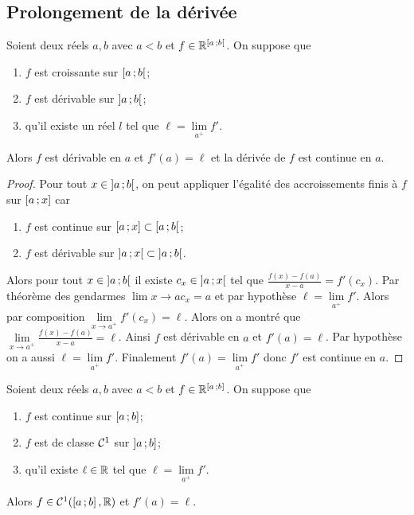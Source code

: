 \subsection{Prolongement de la dérivée}

\begin{theo}
  Soient deux réels \(a,b\) avec \(a <b\) et \(f \in \mathbb{R}^{\left[ a \, ; {} b \right[}\).
  On suppose que
  \begin{enumerate}
    \item \(f\) est croissante sur \(\left[ a \, ; {} b \right[\);
    \item \(f\) est dérivable sur \(\left] a \, ; {} b \right[\);
    \item qu'il existe un réel \(l\) tel que \(\ell = \lim\limits_{a^+}f'\).
  \end{enumerate}
  Alors \(f\) est dérivable en \(a\) et \(f'(a)=\ell\) et la dérivée de \(f\)
  est continue en \(a\).
\end{theo}
\begin{proof}
  Pour tout \(x \in \left] a \, ; {} b \right[\), on peut appliquer l'égalité des
  accroissements finis à \(f\) sur \(\left[ a \, ; {} x \right]\) car
  \begin{enumerate}
    \item \(f\) est continue sur \(\left[ a \, ; {} x \right] \subset
      \left[ a \, ; {} b \right[\);
    \item \(f\) est dérivable sur \(\left] a \, ; {} x \right[ \subset
      \left] a \, ; {} b \right[\).
  \end{enumerate}
  Alors pour tout \(x \in  \left] a \, ; {} b \right[\) il existe \(c_x \in 
  \left] a \, ; {} x \right[\) tel
  que \(\frac{f(x)-f(a)}{x-a}=f'(c_x)\). Par théorème des gendarmes
  \(\lim\limits{x \to a} c_x=a\) et par hypothèse \(\ell =
  \lim\limits_{a^+}f'\). Alors par composition \(\lim\limits_{x \to a^+}
  f'(c_x)=\ell\). Alors on a montré que \(\lim\limits_{x \to a^+}
  \frac{f(x)-f(a)}{x-a} = \ell\). Ainsi \(f\) est dérivable en \(a\) et
  \(f'(a)=\ell\). Par hypothèse on a aussi \(\ell = \lim\limits_{a^+}f'\).
  Finalement \(f'(a)=\lim\limits_{a^+}f'\) donc \(f'\) est continue en \(a\).
\end{proof}
\begin{corth}
  Soient deux réels \(a,b\) avec \(a<b\) et \(f\in \mathbb{R}^{\left[ a \, ; {} b \right]}\).
  On suppose que
  \begin{enumerate}
    \item \(f\) est continue sur \(\left[ a \, ; {} b \right]\);
    \item \(f\) est de classe \(\mathcal{C}^{1}\) sur \(\left] a \, ; {} b \right]\);
    \item qu'il existe \(\ell \in \mathbb{R}\) tel que \(\ell=\lim\limits_{a^+}f'\).
  \end{enumerate}
  Alors \(f \in \mathcal{C}^{1}(\left[ a \, ; {} b \right],\mathbb{R})\) et \(f'(a)=\ell\).
\end{corth}


